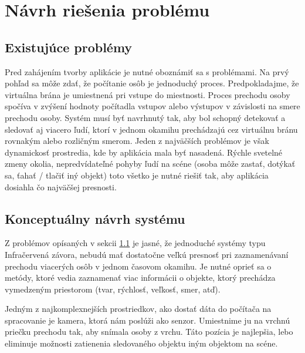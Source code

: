 

\chapter{Návrh riešenia problému}
\section{Existujúce problémy}
\label{sec:problems}
Pred zahájením tvorby aplikácie je nutné oboznámiť sa s problémami. Na prvý pohľad  sa môže zdať, že  počítanie osôb je jednoduchý proces. Predpokladajme, že virtuálna brána je umiestnená pri vstupe do miestnosti. Proces prechodu osoby spočíva v zvýšení hodnoty počítadla vstupov alebo výstupov v závislosti na smere prechodu osoby. Systém musí byť navrhnutý tak, aby bol schopný detekovať a sledovať aj viacero ľudí, ktorí v jednom okamihu prechádzajú cez virtuálnu bránu rovnakým alebo rozličným smerom. Jeden z najväčších problémov je však dynamickosť prostredia, kde by aplikácia mala byť nasadená. Rýchle svetelné zmeny okolia, nepredvídateľné pohyby ľudí na scéne (osoba môže zastať, dotýkať sa, ťahať / tlačiť iný objekt) toto všetko je nutné riešiť tak, aby aplikácia dosiahla čo najväčšej presnosti. 

\section{Konceptuálny návrh systému}
\label{sec:draft}
Z problémov opísaných v sekcii \ref{sec:problems} je jasné, že jednoduché systémy typu Infračervená závora, nebudú mať dostatočne veľkú presnosť pri zaznamenávaní prechodu viacerých osôb v jednom časovom okamihu. Je nutné oprieť sa o metódy, ktoré vedia zaznamenať viac informácii o objekte, ktorý prechádza vymedzeným priestorom (tvar, rýchlosť, veľkosť, smer, atď). 

Jedným z najkomplexnejších prostriedkov, ako dostať dáta do počítača na spracovanie je kamera, ktorá nám poslúži ako senzor. Umiestnime ju na vrchnú priečku prechodu tak, aby snímala osoby z vrchu. Táto pozícia je najlepšia, lebo eliminuje možnosti zatienenia sledovaného objektu iným objektom na scéne.  

